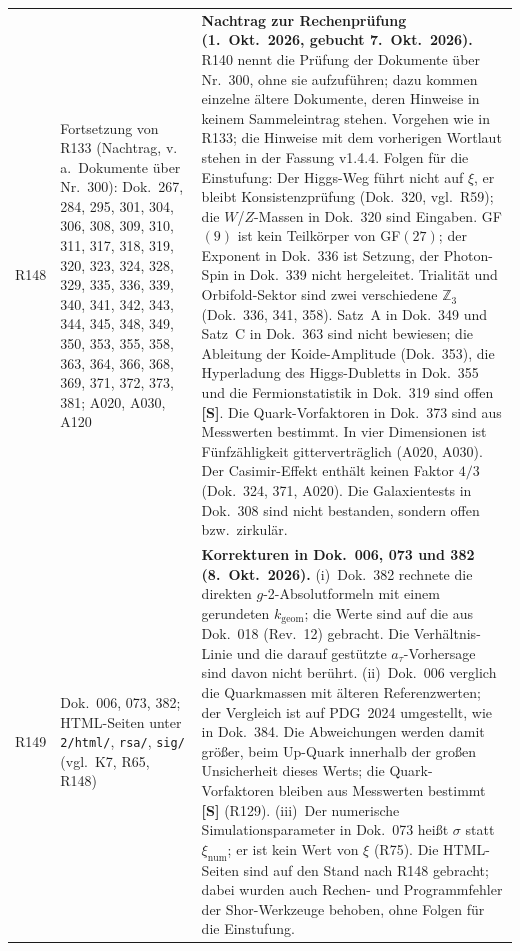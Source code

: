 \begin{longtable}{@{}p{0.9cm}p{3.1cm}p{10.2cm}@{}}
R148 & Fortsetzung von R133 (Nachtrag, v.\,a.\ Dokumente über Nr.~300): Dok.~267, 284, 295, 301, 304, 306, 308, 309, 310, 311, 317, 318, 319, 320, 323, 324, 328, 329, 335, 336, 339, 340, 341, 342, 343, 344, 345, 348, 349, 350, 353, 355, 358, 363, 364, 366, 368, 369, 371, 372, 373, 381; A020, A030, A120 & \textbf{Nachtrag zur Rechenprüfung (1.~Okt.~2026, gebucht 7.~Okt.~2026).} R140 nennt die Prüfung der Dokumente über Nr.~300, ohne sie aufzuführen; dazu kommen einzelne ältere Dokumente, deren Hinweise in keinem Sammeleintrag stehen. Vorgehen wie in R133; die Hinweise mit dem vorherigen Wortlaut stehen in der Fassung v1.4.4. Folgen für die Einstufung: Der Higgs-Weg führt nicht auf $\xi$, er bleibt Konsistenzprüfung (Dok.~320, vgl.\ R59); die $W$/$Z$-Massen in Dok.~320 sind Eingaben. GF$(9)$ ist kein Teilkörper von GF$(27)$; der Exponent in Dok.~336 ist Setzung, der Photon-Spin in Dok.~339 nicht hergeleitet. Trialität und Orbifold-Sektor sind zwei verschiedene $\mathbb{Z}_3$ (Dok.~336, 341, 358). Satz~A in Dok.~349 und Satz~C in Dok.~363 sind nicht bewiesen; die Ableitung der Koide-Amplitude (Dok.~353), die Hyperladung des Higgs-Dubletts in Dok.~355 und die Fermionstatistik in Dok.~319 sind offen \textbf{[S]}. Die Quark-Vorfaktoren in Dok.~373 sind aus Messwerten bestimmt. In vier Dimensionen ist Fünfzähligkeit gitterverträglich (A020, A030). Der Casimir-Effekt enthält keinen Faktor $4/3$ (Dok.~324, 371, A020). Die Galaxientests in Dok.~308 sind nicht bestanden, sondern offen bzw.\ zirkulär. \\
R149 & Dok.~006, 073, 382; HTML-Seiten unter \texttt{2/html/}, \texttt{rsa/}, \texttt{sig/} (vgl.\ K7, R65, R148) & \textbf{Korrekturen in Dok.~006, 073 und 382 (8.~Okt.~2026).} (i)~Dok.~382 rechnete die direkten $g$-2-Absolutformeln mit einem gerundeten $k_{\mathrm{geom}}$; die Werte sind auf die aus Dok.~018 (Rev.~12) gebracht. Die Verhältnis-Linie und die darauf gestützte $a_\tau$-Vorhersage sind davon nicht berührt. (ii)~Dok.~006 verglich die Quarkmassen mit älteren Referenzwerten; der Vergleich ist auf PDG~2024 umgestellt, wie in Dok.~384. Die Abweichungen werden damit größer, beim Up-Quark innerhalb der großen Unsicherheit dieses Werts; die Quark-Vorfaktoren bleiben aus Messwerten bestimmt \textbf{[S]} (R129). (iii)~Der numerische Simulationsparameter in Dok.~073 heißt $\sigma$ statt $\xi_{\mathrm{num}}$; er ist kein Wert von $\xi$ (R75). Die HTML-Seiten sind auf den Stand nach R148 gebracht; dabei wurden auch Rechen- und Programmfehler der Shor-Werkzeuge behoben, ohne Folgen für die Einstufung. \\

\end{longtable}
